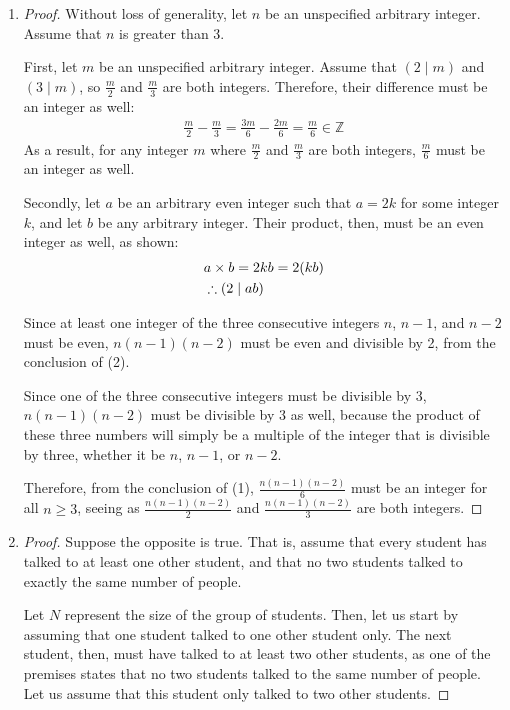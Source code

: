 \documentclass[11pt, notitlepage, leqno]{article}
\begin{document}
\begin{enumerate}
\begin{enumerate}
\end{enumerate}

\item \begin{proof}Without loss of generality, let $n$ be an unspecified arbitrary integer. Assume that $n$ is greater than 3.

First, let $m$ be an unspecified arbitrary integer. Assume that $(2 \mid m)$ and $(3 \mid m)$, so $\frac{m}{2}$ and $\frac{m}{3}$ are both integers. Therefore, their difference must be an integer as well:
\begin{align}
	\frac{m}{2} - \frac{m}{3} = \frac{3m}{6} - \frac{2m}{6} = \frac{m}{6} \in \mathbb{Z}
\end{align}
As a result, for any integer $m$ where $\frac{m}{2}$ and $\frac{m}{3}$ are both integers, $\frac{m}{6}$ must be an integer as well.

Secondly, let $a$ be an arbitrary even integer such that $a=2k$ for some integer $k$, and let $b$ be any arbitrary integer. Their product, then, must be an even integer as well, as shown:
\begin{align}
	&a \times b = 2kb = 2(kb)\notag\\
	&\therefore (2 \mid ab)
\end{align}

Since at least one integer of the three consecutive integers $n$, $n-1$, and $n-2$ must be even, $n(n-1)(n-2)$ must be even and divisible by 2, from the conclusion of (2).

Since one of the three consecutive integers must be divisible by 3, $n(n-1)(n-2)$ must be divisible by 3 as well, because the product of these three numbers will simply be a multiple of the integer that is divisible by three, whether it be $n$, $n-1$, or $n-2$.

Therefore, from the conclusion of (1), $\frac{n(n-1)(n-2)}{6}$ must be an integer for all $n \geq 3$, seeing as $\frac{n(n-1)(n-2)}{2}$ and $\frac{n(n-1)(n-2)}{3}$ are both integers.
\end{proof}

\item \begin{proof} Suppose the opposite is true. That is, assume that every student has talked to at least one other student, and that no two students talked to exactly the same number of people.

Let $N$ represent the size of the group of students. Then, let us start by assuming that one student talked to one other student only. The next student, then, must have talked to at least two other students, as one of the premises states that no two students talked to the same number of people. Let us assume that this student only talked to two other students.


\end{proof}
\end{enumerate}
\end{document}
